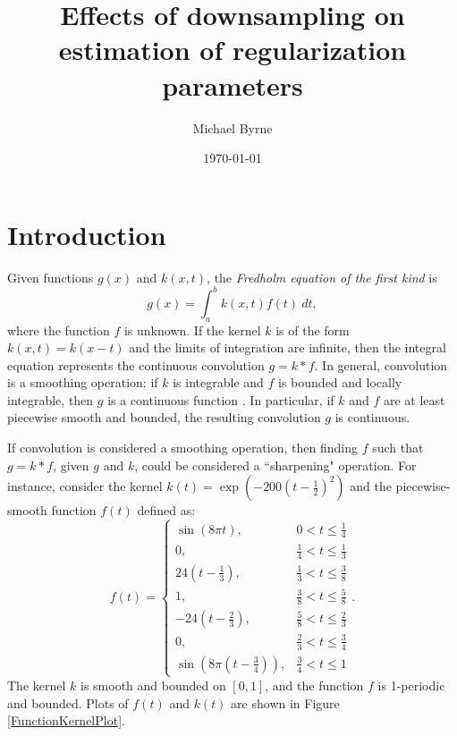 \documentclass[12pt]{book}
\title{Effects of downsampling on estimation of regularization parameters}
\author{Michael Byrne}
\date{\today}
\begin{document}
\maketitle
\tableofcontents

\chapter{Introduction} \label{sec:Introduction}
Given functions $g(x)$ and $k(x,t)$, the \textit{Fredholm equation of the first kind} is
\begin{equation}
g(x) = \int_a^b k(x,t)f(t)\:dt,
\label{eq:Con}
\end{equation}
where the function $f$ is unknown. If the kernel $k$ is of the form $k(x,t) = k(x-t)$ and the limits of integration are infinite, then the integral equation represents the continuous convolution $g = k * f$. In general, convolution is a smoothing operation: if $k$ is integrable and $f$ is bounded and locally integrable, then $g$ is a continuous function \cite{DebnathLokenath1999ItHs}. In particular, if $k$ and $f$ are at least piecewise smooth and bounded, the resulting convolution $g$ is continuous. \par
If convolution is considered a smoothing operation, then finding $f$ such that $g = k * f$, given $g$ and $k$, could be considered a ``sharpening" operation. For instance, consider the kernel $k(t) = \exp(-200(t-\frac{1}{2})^2)$ and the piecewise-smooth function $f(t)$ defined as:
\begin{equation}
f(t) = \begin{cases}
\sin\left(8\pi{t}\right), & 0 < t \leq \frac{1}{4} \\
0, & \frac{1}{4} < t \leq \frac{1}{3} \\
24\left(t-\frac{1}{3}\right), & \frac{1}{3} < t \leq \frac{3}{8} \\
1, & \frac{3}{8} < t \leq \frac{5}{8} \\
-24\left(t-\frac{2}{3}\right), & \frac{5}{8} < t \leq \frac{2}{3} \\
0, & \frac{2}{3} < t \leq \frac{3}{4} \\
\sin\left(8\pi\left(t-\frac{3}{4}\right)\right), & \frac{3}{4} < t \leq 1
\end{cases}.
\label{eq:Test Function 2}
\end{equation}
The kernel $k$ is smooth and bounded on $[0,1]$, and the function $f$ is 1-periodic and bounded. Plots of $f(t)$ and $k(t)$ are shown in Figure \ref{FunctionKernelPlot}. \par
\end{document}

